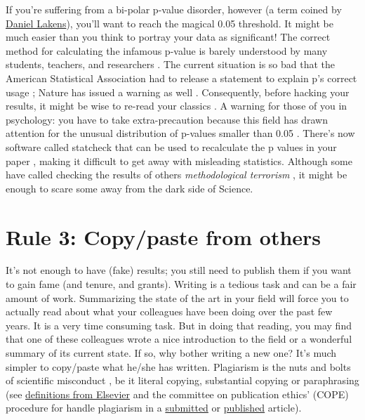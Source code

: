 \documentclass[11pt,letter]{article}
\providecommand\citep{\cite}
\begin{document}
If you're
suffering from a bi-polar p-value disorder, however (a term coined by
\href{http://daniellakens.blogspot.fr/2014/05/the-probability-of-p-values-as-function.html}{Daniel
  Lakens}), you'll want to reach the magical 0.05 threshold. It might be much easier than you think to portray your data as significant! The correct method for calculating the
infamous p-value is barely understood by many students, teachers, and
researchers \citep{haller:2002,lecoutre:2003}. The current situation is so bad that the American Statistical Association had to release a
statement to explain p's correct usage \citep{wasserstein:2016,};
Nature has issued a warning as well
\citep{baker:2016}. Consequently, before hacking your results, it might be wise
to re-read your classics
\citep{simmons:2011,cumming:2012a,cumming:2012b,colquhoun:2014}. A warning for those of you in psychology: you have to take extra-precaution because this field has drawn attention for the unusual distribution of
p-values smaller than 0.05 \citep{hartgerink:2016,bakker:2012}. There's now software called statcheck that can be used to recalculate the p values in your paper \citep{nuijten:2015,epskamp:2016}, making it difficult to get away with misleading statistics. Although some have called checking the results of others {\em
  methodological terrorism} \citep{finske:2016}, it might be enough to scare some away from the dark side of Science.


\section*{Rule 3: Copy/paste from others}

It's not enough to have (fake) results; you still need to publish them if you want to gain fame (and tenure, and grants). Writing is a tedious task
and can be a fair amount of work. Summarizing the state of the art in your
field will force you to actually read about what your colleagues have been doing
over the past few years. It is a very time consuming task. But in doing that reading, you may find that one of these
colleagues wrote a nice introduction to the field or a wonderful summary of its current state. If so, why bother writing a new one? It's much simpler to copy/paste what he/she has written.  Plagiarism is the nuts and bolts of scientific misconduct
\citep{neuroskeptic:2017}, be it literal copying, substantial copying or
paraphrasing (see
\href{https://www.elsevier.com/editors/perk/plagiarism-complaints}{definitions
  from Elsevier} and the committee on publication ethics' (COPE) procedure for
handle plagiarism in a
\href{https://www.elsevier.com/__data/assets/pdf_file/0005/72815/plagiarism-A.pdf}{submitted}
or
\href{https://www.elsevier.com/__data/assets/pdf_file/0020/72830/plagiarism-B_0.pdf}{published}
article). 
\end{document}
